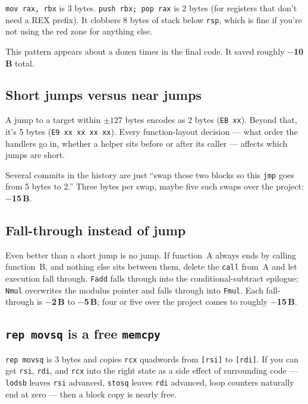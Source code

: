 \documentclass[11pt,a4paper]{article}
\newcommand{\saved}[1]{\textcolor{green!50!black}{\textbf{$-$#1\,B}}}
\begin{document}
\texttt{mov rax, rbx} is 3 bytes. \texttt{push rbx; pop rax} is 2
bytes (for registers that don't need a REX prefix). It clobbers 8
bytes of stack below \texttt{rsp}, which is fine if you're not using
the red zone for anything else.

This pattern appears about a dozen times in the final code. It saved
roughly \saved{10} total.

\subsection{Short jumps versus near jumps}

A jump to a target within $\pm 127$ bytes encodes as 2 bytes
(\texttt{EB xx}). Beyond that, it's 5 bytes (\texttt{E9 xx xx xx
xx}). Every function-layout decision --- what order the handlers go
in, whether a helper sits before or after its caller --- affects
which jumps are short.

Several commits in the history are just ``swap these two blocks so
this \texttt{jmp} goes from 5 bytes to 2.'' Three bytes per swap,
maybe five such swaps over the project: \saved{15}.

\subsection{Fall-through instead of jump}

Even better than a short jump is no jump. If function~A always
ends by calling function~B, and nothing else sits between them,
delete the \texttt{call} from~A and let execution fall through.
\texttt{Fadd} falls through into the conditional-subtract epilogue;
\texttt{Nmul} overwrites the modulus pointer and falls through into
\texttt{Fmul}. Each fall-through is \saved{2} to \saved{5}; four or
five over the project comes to roughly \saved{15}.

\subsection{\texttt{rep movsq} is a free \texttt{memcpy}}

\texttt{rep movsq} is 3 bytes and copies \texttt{rcx} quadwords from
\texttt{[rsi]} to \texttt{[rdi]}. If you can get \texttt{rsi},
\texttt{rdi}, and \texttt{rcx} into the right state as a side
effect of surrounding code --- \texttt{lodsb} leaves
\texttt{rsi} advanced, \texttt{stosq} leaves \texttt{rdi} advanced,
loop counters naturally end at zero --- then a block copy is nearly
free.
\end{document}
